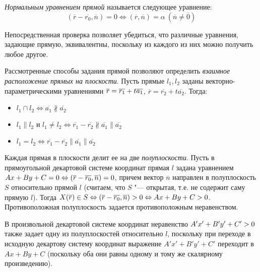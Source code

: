 \begin{definition}
	\textit{Нормальным уравнением прямой} называется следующее уравнение:
	\[(\overline{r} - \overline{r_0}, \overline{n}) = 0 \Leftrightarrow (\overline{r}, \overline{n}) = \alpha~(\overline{n} \ne \overline{0})\]
\end{definition}

\begin{note}
	Непосредственная проверка позволяет убедиться, что различные уравнения, задающие прямую, эквивалентны, поскольку из каждого из них можно получить любое другое.
\end{note}

\begin{note}
	Рассмотренные способы задания прямой позволяют определить \textit{взаимное расположение прямых на плоскости}. Пусть прямые $l_1, l_2$ заданы векторно-параметрическими уравнениями $\overline{r} \hm{=} \overline{r_1} + t\overline{a_1}$, $\overline{r} = \overline{r_2} + t\overline{a_2}$. Тогда:
	\begin{itemize}
		\item $l_1 \cap l_2 \Leftrightarrow \overline{a_1} \nparallel \overline{a_2}$
		\item $l_1 \parallel l_2 \text{ и } l_1 \ne l_2 \Leftrightarrow \overline{r_1} - \overline{r_2} \nparallel \overline{a_1} \parallel \overline{a_2}$
		\item $l_1 = l_2 \Leftrightarrow \overline{r_1} - \overline{r_2} \parallel \overline{a_1} \parallel \overline{a_2}$
	\end{itemize}
\end{note}

\begin{note}
	Каждая прямая в плоскости делит ее на две \textit{полуплоскости}.
	Пусть в прямоугольной декартовой системе координат прямая $l$ задана уравнением $Ax+By+C = 0 \Leftrightarrow (\overline{r} \hm{-} \overline{r_0}, \overline{n}) = 0$, причем вектор $\overline{n}$ направлен в полуплоскость $S$ относительно прямой $l$ (считаем, что $S$ "--- открытая, т.\:е. не содержит саму прямую $l$). Тогда $X(\overline{r}) \in S \Leftrightarrow (\overline{r} \hm{-} \overline{r_0}, \overline{n}) > 0 \hm{\Leftrightarrow} Ax+By+C > 0$. Противоположная полуплоскость задается противоположным неравенством.
	
	В произвольной декартовой системе координат неравенство $A'x'\hm{+}B'y'+C' > 0$ также задает одну из полуплоскостей относительно $l$, поскольку при переходе в исходную декартову систему координат выражение $A'x'+B'y'+C'$ переходит в $Ax+By+C$ (поскольку оба они равны одному и тому же скалярному произведению).
\end{note}

